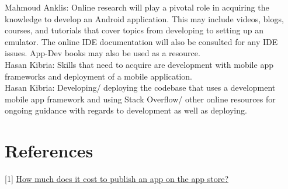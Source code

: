 \documentclass[12pt,letterpaper]{article}
\begin{document}
\noindent Mahmoud Anklis: Online research will play a pivotal role in acquiring the knowledge to develop an Android application. This may include videos, blogs, courses, and tutorials that cover topics from developing to setting up an emulator. The online IDE documentation will also be consulted for any IDE issues. App-Dev books may also be used as a resource.\\

\noindent Hasan Kibria: Skills that need to acquire are development with mobile app frameworks and deployment of a mobile application.\\
	
\noindent Hasan Kibria: Developing/ deploying the codebase that uses a development mobile app framework and using Stack Overflow/ other online resources for ongoing guidance with regards to development as well as deploying.\\

\newpage 

\section{References}
[1] \href{https://www.appypie.com/faqs/how-much-does-it-cost-to-publish-an-app-on-the-app-store}{\color{blue}How much does it cost to publish an app on the app store?}
\end{document}
